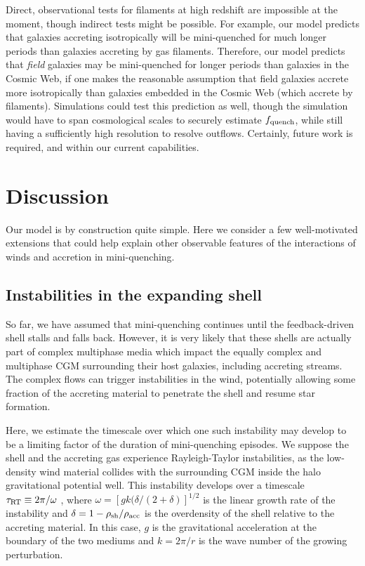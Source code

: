 \documentclass[a4paper,11pt]{article}
\begin{document}
Direct, observational tests for filaments at high redshift are impossible at the moment, though indirect tests might be possible. For example, our model predicts that galaxies accreting isotropically will be mini-quenched for much longer periods than galaxies accreting by gas filaments. Therefore, our model predicts that \textit{field} galaxies may be mini-quenched for longer periods than galaxies in the Cosmic Web, if one makes the reasonable assumption that field galaxies accrete more isotropically than galaxies embedded in the Cosmic Web (which accrete by filaments). Simulations could test this prediction as well, though the simulation would have to span cosmological scales to securely estimate $f_{\rm quench}$, while still having a sufficiently high resolution  to resolve outflows. Certainly, future work is required, and within our current capabilities.

\section{Discussion} \label{sec:discussion}

Our model is by construction quite simple. Here we consider a few well-motivated extensions that could help explain other observable features of the interactions of winds and accretion in mini-quenching. 

\subsection{Instabilities in the expanding shell} 

So far, we have assumed that mini-quenching continues until the feedback-driven shell stalls and falls back. However, it is very likely that these shells are actually part of complex multiphase media which impact the equally complex and multiphase CGM surrounding their host galaxies, including accreting streams. The complex flows can trigger instabilities in the wind, potentially allowing some fraction of the accreting material to penetrate the shell and resume star formation. 

Here, we estimate the timescale over which one such instability may develop to be a limiting factor of the duration of mini-quenching episodes. We suppose the shell and the accreting gas experience Rayleigh-Taylor instabilities, as the low-density wind material collides with the surrounding CGM inside the halo gravitational potential well. This instability develops over a timescale $\tau_{\rm RT} \equiv 2\pi/\omega$ \cite{GalaxyFormation&Evolution2010}, where $\omega =[g k (\delta/(2 + \delta)]^{1/2}$ is the linear growth rate of the instability and $\delta = 1 - \rho_{\rm sh} / \rho_{\rm acc}$ is the overdensity of the shell relative to the accreting material. In this case, $g$ is the gravitational acceleration at the boundary of the two mediums and $k = 2 \pi / r$ is the wave number of the growing perturbation. 
\end{document}
